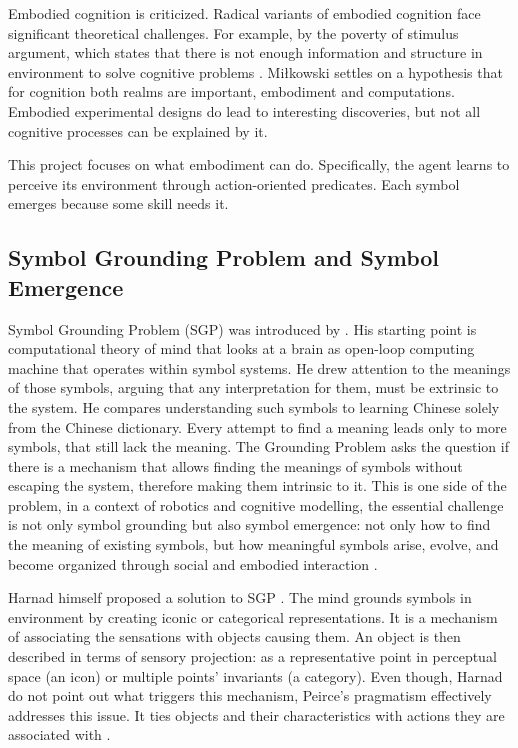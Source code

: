 Embodied cognition is criticized. Radical variants of embodied cognition face significant theoretical challenges. For example, by the poverty of stimulus argument, which states that there is not enough information and structure in environment to solve cognitive problems \parencite{milkowski2017situatedness}. Miłkowski settles on a hypothesis that for cognition both realms are important, embodiment and computations. Embodied experimental designs do lead to interesting discoveries, but not all cognitive processes can be explained by it. 

This project focuses on what embodiment can do. Specifically, the agent learns to perceive its environment through action-oriented predicates. Each symbol emerges because some skill needs it. 

\subsection{Symbol Grounding Problem and Symbol Emergence} \label{chapter:theory:SGP}
Symbol Grounding Problem (SGP) was introduced by \textcite{harnad1990symbol}. His starting point is computational theory of mind that looks at a brain as open-loop computing machine that operates within symbol systems. He drew attention to the meanings of those symbols, arguing that any interpretation for them, must be extrinsic to the system. He compares understanding such symbols to learning Chinese solely from the Chinese dictionary. Every attempt to find a meaning leads only to more symbols, that still lack the meaning. The Grounding Problem asks the question if there is a mechanism that allows finding the meanings of symbols without escaping the system, therefore making them intrinsic to it. This is one side of the problem, in a context of robotics and cognitive modelling, the essential challenge is not only symbol grounding but also symbol emergence: not only how to find the meaning of existing symbols, but how meaningful symbols arise, evolve, and become organized through social and embodied interaction \parencite{taniguchi2016symbol}.

Harnad himself proposed a solution to SGP \parencite{harnad1990symbol}. The mind grounds symbols in environment by creating iconic or categorical representations. It is a mechanism of associating the sensations with objects causing them. An object is then described in terms of sensory projection: as a representative point in perceptual space (an icon) or multiple points' invariants (a category). Even though, Harnad do not point out what triggers this mechanism, Peirce’s pragmatism effectively addresses this issue. It ties objects and their characteristics with actions they are associated with \parencite{kato2026pragmatism}. 

